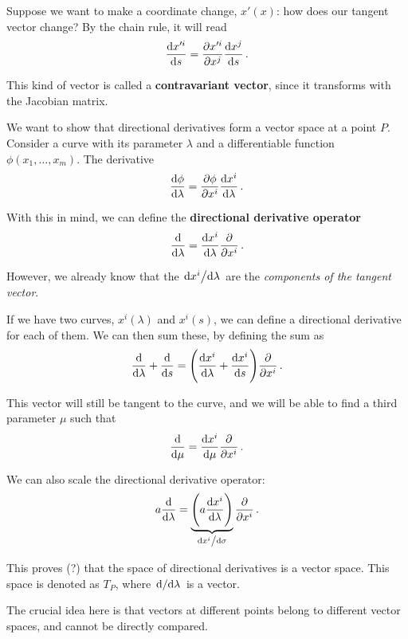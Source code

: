 \documentclass[main.tex]{subfiles}
\begin{document}
Suppose we want to make a coordinate change, \(x'(x)\): how does our tangent vector change? 
By the chain rule, it will read 
%
\begin{align}
\dv{x^{\prime i}}{s} = \pdv{x^{\prime i}}{x^{j}} \dv{x^{j}}{s}
\,.
\end{align}

This kind of vector is called a \textbf{contravariant vector}, since it transforms with the Jacobian matrix. 

We want to show that directional derivatives form a vector space at a point \(P\). 
Consider a curve with its parameter \(\lambda \) and a differentiable function \(\phi (x_1, \dots, x_m)\). 
The derivative 
%
\begin{align}
\dv{\phi }{\lambda } = \pdv{\phi }{x^i} \dv{x^{i}}{\lambda } 
\,.
\end{align}

With this in mind, we can define the \textbf{directional derivative operator} 
%
\begin{align}
\dv{}{\lambda } = \dv{x^{i}}{\lambda } \pdv{}{x^{i}}
\,.
\end{align}

However, we already know that the \(\dv*{x^{i}}{\lambda }\) are the \emph{components of the tangent vector}.

If we have two curves, \(x^{i}(\lambda )\) and \(x^{i} (s)\), we can define a directional derivative for each of them.
We can then sum these, by defining the sum as 
%
\begin{align}
\dv{}{\lambda } + \dv{}{s} = \qty(\dv{x^{i}}{\lambda } + \dv{x^{i}}{s}) \pdv{}{x^{i}}
\,.
\end{align}

This vector will still be tangent to the curve, and we will be able to find a third parameter \(\mu \) such that 
%
\begin{align}
\dv{}{\mu } = \dv{x^{i}}{\mu } \pdv{}{x^{i}}
\,.
\end{align}

We can also scale the directional derivative operator: 
%
\begin{align}
a \dv{}{\lambda } = \underbrace{\qty(a \dv{x^{i}}{\lambda })}_{\dv*{x^{i}}{\sigma }} \pdv{}{x^{i}}
\,.
\end{align}

This proves (?) that the space of directional derivatives is a vector space. 
This space is denoted as \(T_P\), where \(\dv*{}{\lambda }\) is a vector.

The crucial idea here is that vectors at different points belong to different vector spaces, and cannot be directly compared. 
\end{document}
